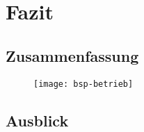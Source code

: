 \chapter{Fazit}

\section{Zusammenfassung}

\begin{figure}[h!]
\centering
\texttt{[image: bsp-betrieb]}
\end{figure}

\section{Ausblick}

